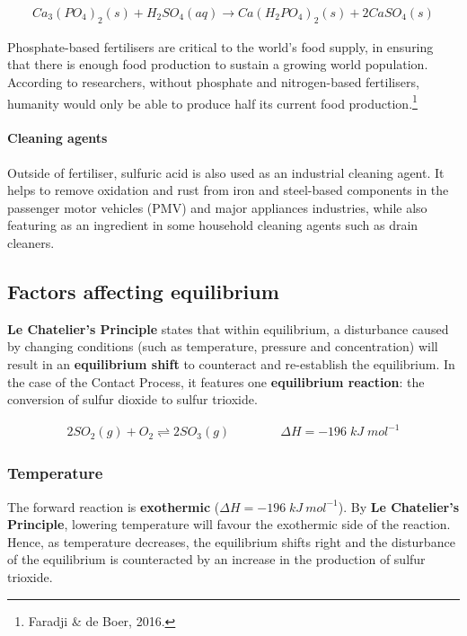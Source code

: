 \documentclass[12pt, a4paper]{article}
\begin{document}
\begin{align}
	Ca_{3}(PO_{4})_{2}(s) + H_{2}SO_{4}(aq) \rightarrow Ca(H_{2}PO_{4})_{2}(s) + 2CaSO_{4}(s)
\end{align}

Phosphate-based fertilisers are critical to the world's food supply, in ensuring that there is enough food production to sustain a growing world population. According to researchers, without phosphate and nitrogen-based fertilisers, humanity would only be able to produce half its current food production.\footnote{Faradji \& de Boer, 2016.}

\paragraph{Cleaning agents}
Outside of fertiliser, sulfuric acid is also used as an industrial cleaning agent. It helps to remove oxidation and rust from iron and steel-based components in the passenger motor vehicles (PMV) and major appliances industries, while also featuring as an ingredient in some household cleaning agents such as drain cleaners.






\subsection{Factors affecting equilibrium}

\textbf{Le Chatelier's Principle} states that within equilibrium, a disturbance caused by changing conditions (such as temperature, pressure and concentration) will result in an \textbf{equilibrium shift} to counteract and re-establish the equilibrium. In the case of the Contact Process, it features one \textbf{equilibrium reaction}: the conversion of sulfur dioxide to sulfur trioxide.

\begin{align}
	2SO_{2}(g) + O_{2} \rightleftharpoons 2SO_{3}(g) \qquad \qquad \Delta H = -196 \; kJ \; mol^{-1}
\end{align}






\subsubsection{Temperature}

The forward reaction is \textbf{exothermic} (\(\Delta H = -196 \; kJ \: mol^{-1}\)). By \textbf{Le Chatelier's Principle}, lowering temperature will favour the exothermic side of the reaction. Hence, as temperature decreases, the equilibrium shifts right and the disturbance of the equilibrium is counteracted by an increase in the production of sulfur trioxide. 
\end{document}
